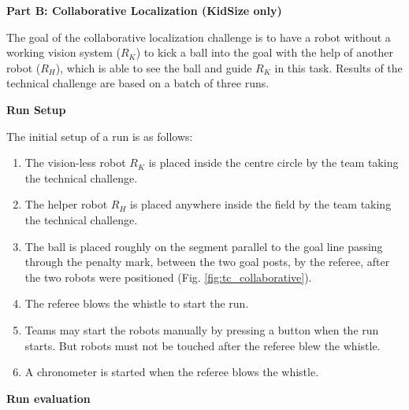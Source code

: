 \clearpage
\sffamily
{\bfseries\color[rgb]{0.4,0.4,0.4} Part B: Collaborative Localization
  (KidSize only)}
{}


\bigskip

The goal of the collaborative localization challenge is to have a  robot without a working vision system ($R_K$) to kick a ball
into the goal with the help of another robot ($R_H$), which is able to see the ball and guide $R_K$ in this task. Results of the technical challenge are based on a batch of three runs.

\bigskip

{\bfseries Run Setup}

\smallskip


The initial setup of a run is as follows:

\begin{enumerate}

\item The vision-less robot $R_K$ is placed inside the centre circle by the team taking the technical challenge.

\item The helper robot $R_H$ is placed anywhere inside the field by the team taking the technical challenge.

\item The ball is placed roughly on the segment parallel to the goal line passing through the penalty mark, between the two goal posts, by the referee, after the two robots were positioned (Fig. \ref{fig:tc_collaborative}).

\item The referee blows the whistle to start the run.

\item Teams may start the robots manually by pressing a button when the run starts. But robots must not be touched after the referee blew the whistle. 

\item A chronometer is started when the referee blows the whistle.
\end{enumerate}

{\bfseries Run evaluation}

\smallskip

